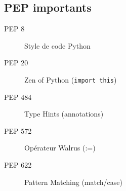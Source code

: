 \documentclass{article}
\newcommand{\cd}{\lstinline}
\begin{document}
\begin{multicols*}{4}
\subsection*{PEP importants}
\begin{description}
    \item[PEP 8] Style de code Python
    \item[PEP 20] Zen of Python (\cd{import this})
    \item[PEP 484] Type Hints (annotations)
    \item[PEP 572] Opérateur Walrus (:=)
    \item[PEP 622] Pattern Matching (match/case)
\end{description}

\end{multicols*}
\end{document}
